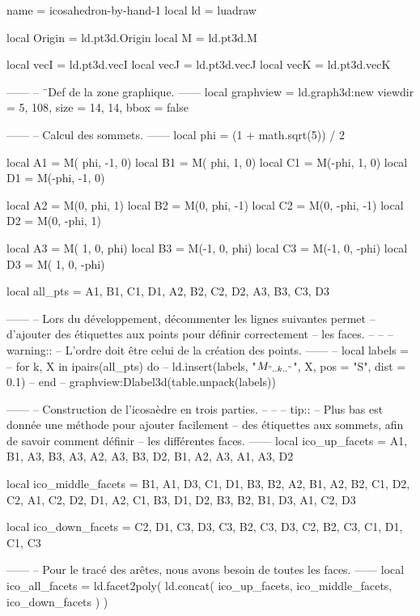 \documentclass[border = 3pt]{standalone}
\begin{document}
\begin{luadraw*}{name = icosahedron-by-hand-1}
local ld = luadraw

local Origin = ld.pt3d.Origin
local M      = ld.pt3d.M

local vecI = ld.pt3d.vecI
local vecJ = ld.pt3d.vecJ
local vecK = ld.pt3d.vecK

------
-- ¨Def de la zone graphique.
------
local graphview = ld.graph3d:new{
  viewdir  = {5, 108},
  size     = {14, 14},
  bbox     = false
}

------
-- Calcul des sommets.
------
local phi = (1 + math.sqrt(5)) / 2

local A1 = M( phi, -1, 0)
local B1 = M( phi,  1, 0)
local C1 = M(-phi,  1, 0)
local D1 = M(-phi, -1, 0)

local A2 = M(0,  phi,  1)
local B2 = M(0,  phi, -1)
local C2 = M(0, -phi, -1)
local D2 = M(0, -phi,  1)

local A3 = M( 1, 0,  phi)
local B3 = M(-1, 0,  phi)
local C3 = M(-1, 0, -phi)
local D3 = M( 1, 0, -phi)

local all_pts = {
  A1, B1, C1, D1,
  A2, B2, C2, D2,
  A3, B3, C3, D3
}

------
-- Lors du développement, décommenter les lignes suivantes permet
-- d'ajouter des étiquettes aux points pour définir correctement
-- les faces.
--
--
--  warning::
--      L'ordre doit être celui de la création des points.
------
-- local labels = {}
-- for k, X in ipairs(all_pts) do
--   ld.insert(labels, {"$M_{".. k .."}$", X, {pos = "S", dist = 0.1}})
-- end
-- graphview:Dlabel3d(table.unpack(labels))

------
-- Construction de l'icosaèdre en trois parties.
--
--
-- tip::
--     Plus bas est donnée une méthode pour ajouter facilement
--     des étiquettes aux sommets, afin de savoir comment définir
--     les différentes faces.
------
local ico_up_facets = {
  {A1, B1, A3},
  {B3, A3, A2},
  {A3, B3, D2},
  {B1, A2, A3},
  {A1, A3, D2}
}

local ico_middle_facets = {
  {B1, A1, D3},
  {C1, D1, B3},
  {B2, A2, B1},
  {A2, B2, C1},
  {D2, C2, A1},
  {C2, D2, D1},
  {A2, C1, B3},
  {D1, D2, B3},
  {B2, B1, D3},
  {A1, C2, D3}
}

local ico_down_facets = {
  {C2, D1, C3},
  {D3, C3, B2},
  {C3, D3, C2},
  {B2, C3, C1},
  {D1, C1, C3}
}

------
-- Pour le tracé des arêtes, nous avons besoin de toutes les faces.
------
local ico_all_facets = ld.facet2poly(
  ld.concat(
    ico_up_facets,
    ico_middle_facets,
    ico_down_facets
  )
)


\end{luadraw*}
\end{document}
